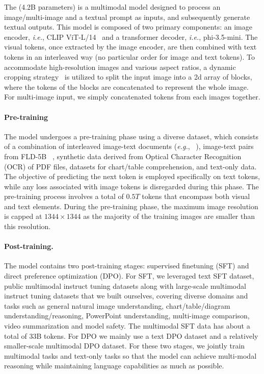 The \textbf{\phivision} (4.2B parameters) is a multimodal model designed to process an image/multi-image and a textual prompt as inputs, and subsequently generate textual outputs. This model is composed of two primary components: an image encoder, \emph{i.e.}, CLIP ViT-L/14~\cite{radford2021learning} and a transformer decoder, \emph{i.e.}, phi-3.5-mini. The visual tokens, once extracted by the image encoder, are then combined with text tokens in an interleaved way (no particular order for image and text tokens). To accommodate high-resolution images and various aspect ratios, a dynamic cropping strategy~\cite{dong2024internlm} is utilized to split the input image into a 2d array of blocks, where the tokens of the blocks are concatenated to represent the whole image.  For multi-image input, we simply concatenated tokens from each images together.

\paragraph{Pre-training} 

The \textbf{\phivision} model undergoes a pre-training phase using a diverse dataset, which consists of a combination of interleaved image-text documents (\emph{e.g.}, ~\cite{laurenccon2024obelics}), image-text pairs from FLD-5B ~\cite{xiao2023florence}, synthetic data derived from Optical Character Recognition (OCR) of PDF files, datasets for chart/table comprehension, and text-only data. The objective of predicting the next token is employed specifically on text tokens, while any loss associated with image tokens is disregarded during this phase. The pre-training process involves a total of $0.5T$ tokens that encompass both visual and text elements. During the pre-training phase, the maximum image resolution is capped at $1344 \times 1344$ as the majority of the training images are smaller than this resolution.

\paragraph{Post-training.} 

The \textbf{\phivision} model contains two post-training stages: supervised finetuning (SFT) and direct preference optimization (DPO). For SFT, we leveraged text SFT dataset, public multimodal instruct tuning datasets along with large-scale multimodal instruct tuning datasets that we built ourselves, covering diverse domains and tasks such as general natural image understanding, chart/table/diagram understanding/reasoning, PowerPoint understanding, multi-image comparison, video summarization and model safety. The multimodal SFT data has about a total of 33B tokens. For DPO we mainly use a text DPO dataset and a relatively smaller-scale multimodal DPO dataset. For these two stages, we jointly train multimodal tasks and text-only tasks so that the model can achieve multi-modal reasoning while maintaining language capabilities as much as possible. 

